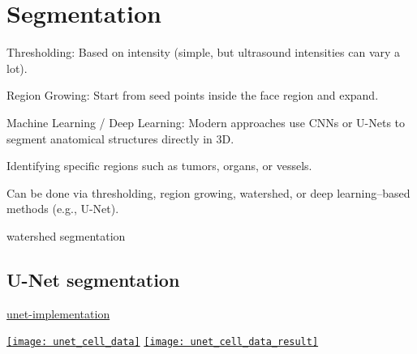 \chapter{Segmentation}


Thresholding: Based on intensity (simple, but ultrasound intensities can vary a lot).

Region Growing: Start from seed points inside the face region and expand.

Machine Learning / Deep Learning: Modern approaches use CNNs or U-Nets to segment anatomical structures directly in 3D.

Identifying specific regions such as tumors, organs, or vessels.

Can be done via thresholding, region growing, watershed, or deep learning–based methods (e.g., U-Net).

watershed segmentation

\section{U-Net segmentation}

\href{https://github.com/byrkbrk/unet-implementation?tab=readme-ov-file}{unet-implementation}

\begin{center}
  \href{https://github.com/vicente-gonzalez-ruiz/medical_imaging/blob/main/notebooks/unet_cell_data.ipynb}{\texttt{[image: unet\_cell\_data]}}
  \href{https://github.com/vicente-gonzalez-ruiz/medical_imaging/blob/main/notebooks/unet_cell_data.ipynb}{\texttt{[image: unet\_cell\_data\_result]}}
\end{center}

